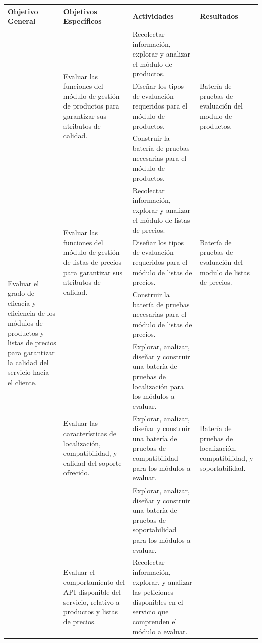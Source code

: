 \begin{table}
\centering
\small
\begin{tabular}{|l|l|p{6.5cm}|l|}
\hline
Objetivo General & Objetivos Específicos & Actividades & Resultados \\
\hline
\multirow{15}{4.0cm}{Evaluar el grado de eficacia y eficiencia de los módulos de productos y listas de precios para garantizar la calidad del servicio hacia el cliente.} &
\multirow{3}{4.0cm}{Evaluar las funciones del módulo de gestión de productos para garantizar sus atributos de calidad.} &
Recolectar información, explorar y analizar el módulo de productos. &
\multirow{3}{4.0cm}{Batería de pruebas de evaluación del modulo de productos.} \\
\cline{3-3}
& & Diseñar los tipos de evaluación requeridos para el módulo de productos. & \\
\cline{3-3}
& & Construir la batería de pruebas necesarias para el módulo de productos. & \\
\cline{2-4}
& \multirow{3}{4.0cm}{Evaluar las funciones del módulo de gestión de listas de precios para garantizar sus atributos de calidad.} &
Recolectar información, explorar y analizar el módulo de listas de precios. &
\multirow{3}{4.0cm}{Batería de pruebas de evaluación del modulo de listas de precios.} \\
\cline{3-3}
& & Diseñar los tipos de evaluación requeridos para el módulo de listas de precios. & \\
\cline{3-3}
& & Construir la batería de pruebas necesarias para el módulo de listas de precios. & \\
\cline{2-4}
& \multirow{3}{4.0cm}{Evaluar las características de localización, compatibilidad, y calidad del soporte ofrecido.} &
Explorar, analizar, diseñar y construir una batería de pruebas de localización para los módulos a evaluar. &
\multirow{3}{4.0cm}{Batería de pruebas de localización, compatibilidad, y soportabilidad.} \\
\cline{3-3}
& & Explorar, analizar, diseñar y construir una batería de pruebas de compatibilidad para los módulos a evaluar. & \\
\cline{3-3}
& & Explorar, analizar, diseñar y construir una batería de pruebas de soportabilidad para los módulos a evaluar. & \\
\cline{2-4}
& \multirow{3}{4.0cm}{Evaluar el comportamiento del API disponible del servicio, relativo a productos y listas de precios.} &
Recolectar información, explorar, y analizar las peticiones disponibles en el servicio que comprenden el módulo a evaluar. &

\end{tabular}
\end{table}
